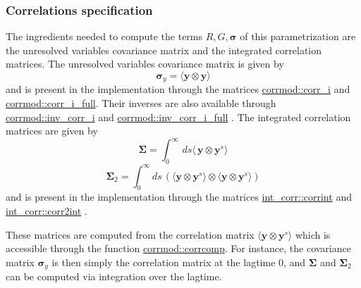 \subsubsection*{Correlations specification}

The ingredients needed to compute the terms $R,G,\boldsymbol\sigma$ of this parametrization are the unresolved variables covariance matrix and the integrated correlation matrices. The unresolved variables covariance matrix is given by \[\boldsymbol\sigma_y = \langle \boldsymbol y \otimes \boldsymbol y \rangle \] and is present in the implementation through the matrices \hyperlink{namespacecorrmod_a859a67113b5271db0df70e60cbf0687b}{corrmod\+::corr\+\_\+i} and \hyperlink{namespacecorrmod_a978b78f1d6906afe06e63768535b44f7}{corrmod\+::corr\+\_\+i\+\_\+full}. Their inverses are also available through \hyperlink{namespacecorrmod_a5a938587078064124588605255e93a19}{corrmod\+::inv\+\_\+corr\+\_\+i} and \hyperlink{namespacecorrmod_af2ab9712d246a94ae1a801a011aee3d8}{corrmod\+::inv\+\_\+corr\+\_\+i\+\_\+full} . The integrated correlation matrices are given by \[ \boldsymbol\Sigma = \int_0^\infty \, ds \langle \, \boldsymbol y \otimes \boldsymbol y^s \rangle \] \[ \boldsymbol\Sigma_2 = \int_0^\infty ds \, \left(\langle \boldsymbol y \otimes \boldsymbol y^s \rangle \otimes \langle \boldsymbol y \otimes \boldsymbol y^s \rangle\right) \] and is present in the implementation through the matrices \hyperlink{namespaceint__corr_ab3c1d22e8c15412a3b535c8301b0c42d}{int\+\_\+corr\+::corrint} and \hyperlink{namespaceint__corr_a1422cac2c54e6d7837159fe9fb3a6d6b}{int\+\_\+corr\+::corr2int} .

These matrices are computed from the correlation matrix $\langle \boldsymbol y \otimes \boldsymbol y^s \rangle$ which is accessible through the function \hyperlink{namespacecorrmod_ad42bfc9c0ec2cf55958a45b46839d856}{corrmod\+::corrcomp}. For instance, the covariance matrix $\boldsymbol\sigma_y$ is then simply the correlation matrix at the lagtime 0, and $\boldsymbol\Sigma$ and $\boldsymbol\Sigma_2$ can be computed via integration over the lagtime.

